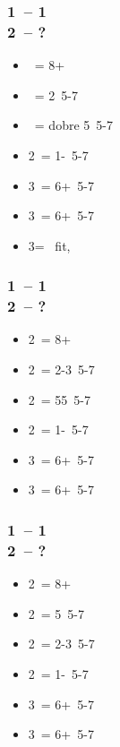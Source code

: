 \documentclass[12pt, a4paper]{report}
\begin{document}
\subsubsection*{1\hearts\ -- 1\spades\ \\ 2\clubs\ -- ?}
\begin{itemize}
    \item \diams\ = 8+
    \item \hearts\ = 2\hearts\ 5-7
    \item \spades\ = dobre 5\spades\ 5-7
    \item 2\ntx\ = 1-\hearts\ 5-7
    \item 3\clubs\ = 6+\clubs\ 5-7
    \item 3\diams\ = 6+\diams\ 5-7
    \item 3\hearts = \hearts\ fit, \gf
\end{itemize}

\subsubsection*{1\hearts\ -- 1\ntx\ \\ 2\clubs\ -- ?}
\begin{itemize}
    \item 2\diams\ = 8+
    \item 2\hearts\ = 2-3\hearts\ 5-7
    \item 2\spades\ = 55\minor\ 5-7
    \item 2\nt\ = 1-\hearts\ 5-7
    \item 3\clubs\ = 6+\clubs\ 5-7
    \item 3\diams\ = 6+\diams\ 5-7
\end{itemize}

\subsubsection*{1\spades\ -- 1\ntx\ \\ 2\clubs\ -- ?}
\begin{itemize}
    \item 2\diams\ = 8+
    \item 2\hearts\ = 5\hearts\ 5-7
    \item 2\spades\ = 2-3\spades\ 5-7
    \item 2\ntx\ = 1-\spades\ 5-7
    \item 3\clubs\ = 6+\clubs\ 5-7
    \item 3\diams\ = 6+\diams\ 5-7
\end{itemize}
\end{document}
